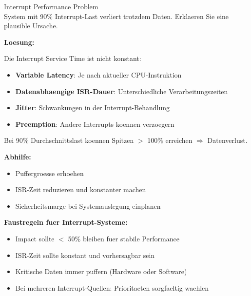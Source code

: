 \begin{example2}{Interrupt Performance Problem}\\
    System mit 90\% Interrupt-Last verliert trotzdem Daten. Erklaeren Sie eine plausible Ursache.
    
    \tcblower
    
    \textbf{Loesung:}
    
    Die Interrupt Service Time ist nicht konstant:
    \begin{itemize}
        \item \textbf{Variable Latency}: Je nach aktueller CPU-Instruktion
        \item \textbf{Datenabhaengige ISR-Dauer}: Unterschiedliche Verarbeitungszeiten
        \item \textbf{Jitter}: Schwankungen in der Interrupt-Behandlung
        \item \textbf{Preemption}: Andere Interrupts koennen verzoegern
    \end{itemize}
    
    Bei 90\% Durchschnittslast koennen Spitzen $>$ 100\% erreichen $\Rightarrow$ Datenverlust.
    
    \textbf{Abhilfe:}
    \begin{itemize}
        \item Puffergroesse erhoehen
        \item ISR-Zeit reduzieren und konstanter machen
        \item Sicherheitsmarge bei Systemauslegung einplanen
    \end{itemize}
\end{example2}

\begin{remark}
    \textbf{Faustregeln fuer Interrupt-Systeme:}
    \begin{itemize}
        \item Impact sollte $<$ 50\% bleiben fuer stabile Performance
        \item ISR-Zeit sollte konstant und vorhersagbar sein
        \item Kritische Daten immer puffern (Hardware oder Software)
        \item Bei mehreren Interrupt-Quellen: Prioritaeten sorgfaeltig waehlen
    \end{itemize}
\end{remark}
